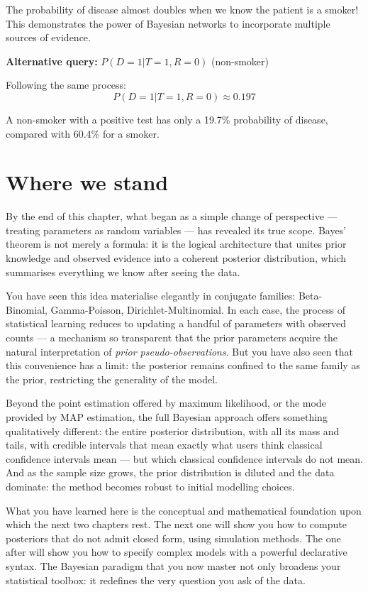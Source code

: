 \begin{examplebox}
\begin{example}
The probability of disease almost doubles when we know the patient is a smoker! This demonstrates the power of Bayesian networks to incorporate multiple sources of evidence.

\textbf{Alternative query:} $P(D=1|T=1, R=0)$ (non-smoker)

Following the same process:
$$P(D=1|T=1, R=0) \approx 0.197$$

A non-smoker with a positive test has only a 19.7\% probability of disease, compared with 60.4\% for a smoker.
\end{example}
\end{examplebox}

\section{Where we stand}

By the end of this chapter, what began as a simple change of perspective — treating parameters as random variables — has revealed its true scope. Bayes' theorem is not merely a formula: it is the logical architecture that unites prior knowledge and observed evidence into a coherent posterior distribution, which summarises everything we know after seeing the data.

You have seen this idea materialise elegantly in conjugate families: Beta-Binomial, Gamma-Poisson, Dirichlet-Multinomial. In each case, the process of statistical learning reduces to updating a handful of parameters with observed counts — a mechanism so transparent that the prior parameters acquire the natural interpretation of \emph{prior pseudo-observations}. But you have also seen that this convenience has a limit: the posterior remains confined to the same family as the prior, restricting the generality of the model.

Beyond the point estimation offered by maximum likelihood, or the mode provided by MAP estimation, the full Bayesian approach offers something qualitatively different: the entire posterior distribution, with all its mass and tails, with credible intervals that mean exactly what users think classical confidence intervals mean — but which classical confidence intervals do not mean. And as the sample size grows, the prior distribution is diluted and the data dominate: the method becomes robust to initial modelling choices.

What you have learned here is the conceptual and mathematical foundation upon which the next two chapters rest. The next one will show you how to compute posteriors that do not admit closed form, using simulation methods. The one after will show you how to specify complex models with a powerful declarative syntax. The Bayesian paradigm that you now master not only broadens your statistical toolbox: it redefines the very question you ask of the data.

